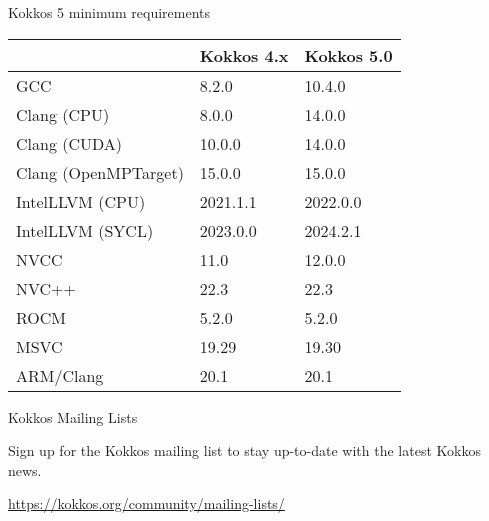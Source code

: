 \begin{frame}[fragile]{Kokkos 5 minimum requirements}

\begin{table}[]
\begin{tabular}{lll}
\multicolumn{1}{r}{} & Kokkos 4.x & Kokkos 5.0 \\ \hline
GCC                  & 8.2.0      & 10.4.0     \\
Clang (CPU)          & 8.0.0      & 14.0.0     \\
Clang (CUDA)         & 10.0.0     & 14.0.0     \\
Clang (OpenMPTarget) & 15.0.0     & 15.0.0     \\
IntelLLVM (CPU)      & 2021.1.1   & 2022.0.0   \\
IntelLLVM (SYCL)     & 2023.0.0   & 2024.2.1   \\
NVCC                 & 11.0       & 12.0.0     \\
NVC++                & 22.3       & 22.3       \\
ROCM                 & 5.2.0      & 5.2.0      \\
MSVC                 & 19.29      & 19.30      \\
ARM/Clang            & 20.1       & 20.1       \\ \hline
\end{tabular}
\end{table}

\end{frame}


\begin{frame}[fragile]{Kokkos Mailing Lists}

\vspace{0.5cm}
\begin{center}
Sign up for the Kokkos mailing list to stay up-to-date with the latest Kokkos news.
\end{center}

\vspace{0.5cm}

\begin{center}
\url{https://kokkos.org/community/mailing-lists/}
\end{center}

\end{frame}

